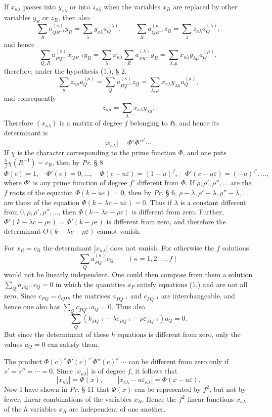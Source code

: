 \documentclass[11pt]{article}
\newcommand{\Hgrp}{\mathfrak{H}}
\newcommand{\eps}{\varepsilon}
\begin{document}
If $x_{\kappa\lambda}$ passes into $y_{\kappa\lambda}$ or into $z_{\kappa\lambda}$ when the variables $x_R$ are replaced by other variables $y_R$ or $z_R$, then also
\[
\sum_R a^{(\kappa)}_{QR^{-1}}y_R=\sum_\lambda y_{\kappa\lambda}a^{(\lambda)}_Q,
\qquad
\sum_R a^{(\kappa)}_{QR^{-1}}z_R=\sum_\lambda z_{\kappa\lambda}a^{(\lambda)}_Q,
\]
and hence
\[
\sum_{Q,R} a^{(\kappa)}_{PQ^{-1}}x_{QR^{-1}}y_R
=\sum_\lambda x_{\kappa\lambda}\sum_R a^{(\lambda)}_{PR^{-1}}y_R
=\sum_{\lambda,\mu}x_{\kappa\lambda}y_{\lambda\mu}a^{(\mu)}_Q,
\]
therefore, under the hypothesis (1.), § 2,
\[
\sum_\mu z_{\kappa\mu}a^{(\mu)}_Q
=\sum_Q a^{(\kappa)}_{PQ^{-1}}z_Q
=\sum_{\lambda,\mu}x_{\kappa\lambda}y_{\lambda\mu}a^{(\mu)}_Q,
\]
and consequently
\[
z_{\kappa\mu}=\sum_\lambda x_{\kappa\lambda}y_{\lambda\mu}.
\]
Therefore $(x_{\kappa\lambda})$ is a matrix of degree $f$ belonging to $\Hgrp$, and hence its determinant is
\[
|x_{\kappa\lambda}|=\Phi^s{\Phi'}^{s'}\cdots.
\]
If $\chi$ is the character corresponding to the prime function $\Phi$, and one puts $\frac{h}{f}\chi(R^{-1})=c_R$, then by \emph{Pr.} § 8
\[
\Phi(c)=1,
\quad \Phi'(c)=0,\ldots,
\quad \Phi(c-u\eps)=(1-u)^f,
\quad \Phi'(c-u\eps)=(-u)^{f'},\ldots,
\]
where $\Phi'$ is any prime function of degree $f'$ different from $\Phi$. If $\rho,\rho',\rho'',\ldots$ are the $f$ roots of the equation $\Phi(k-u\eps)=0$, then by \emph{Pr.} § 6, $\rho-\lambda,\rho'-\lambda,\rho''-\lambda,\ldots$ are those of the equation $\Phi(k-\lambda c-u\eps)=0$. Thus if $\lambda$ is a constant different from $0,\rho,\rho',\rho'',\ldots$, then $\Phi(k-\lambda c-\rho\eps)$ is different from zero. Further, $\Phi'(k-\lambda c-\rho\eps)=\Phi'(k-\rho\eps)$ is different from zero, and therefore the determinant $\Theta(k-\lambda c-\rho\eps)$ cannot vanish.

For $x_R=c_R$ the determinant $|x_{\kappa\lambda}|$ does not vanish. For otherwise the $f$ solutions
\[
\sum_Q a^{(\kappa)}_{PQ^{-1}}c_Q\qquad(\kappa=1,2,\ldots,f)
\]
would not be linearly independent. One could then compose from them a solution $\sum_Q a_{PQ^{-1}}c_Q=0$ in which the quantities $a_P$ satisfy equations (1.) and are not all zero. Since $c_{PQ}=c_{QP}$, the matrices $a_{PQ^{-1}}$ and $c_{PQ^{-1}}$ are interchangeable, and hence one also has $\sum_Q c_{PQ^{-1}}a_Q=0$. Thus also
\[
\sum_Q(k_{PQ^{-1}}-\lambda c_{PQ^{-1}}-\rho\eps_{PQ^{-1}})a_Q=0.
\]
But since the determinant of these $h$ equations is different from zero, only the values $a_Q=0$ can satisfy them.

The product $\Phi(c)^s{\Phi'}(c)^{s'}{\Phi''}(c)^{s''}\cdots$ can be different from zero only if $s'=s''=\cdots=0$. Since $|x_{\kappa\lambda}|$ is of degree $f$, it follows that
\begin{equation}\tag{3.}
|x_{\kappa\lambda}|=\Phi(x),\qquad |x_{\kappa\lambda}-u\eps_{\kappa\lambda}|=\Phi(x-u\eps).
\end{equation}
Now I have shown in \emph{Pr.} § 11 that $\Phi(x)$ can be represented by $f^2$, but not by fewer, linear combinations of the variables $x_R$. Hence the $f^2$ linear functions $x_{\kappa\lambda}$ of the $h$ variables $x_R$ are independent of one another.
\end{document}

